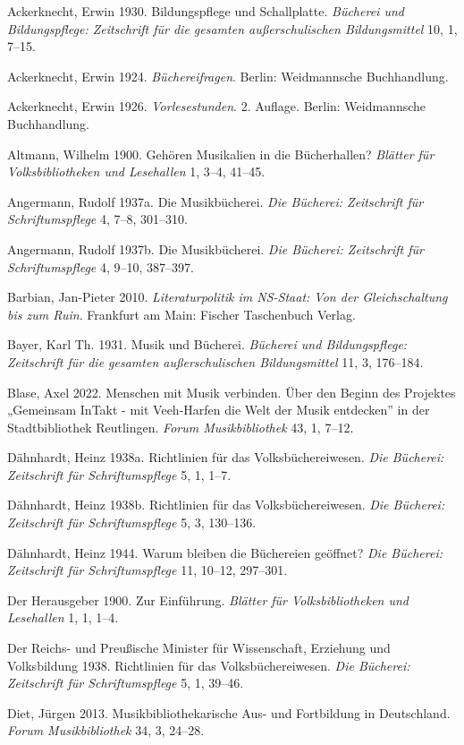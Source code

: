 \documentclass[a4paper,
fontsize=11pt,
oneside,
numbers=noperiodatend,
parskip=half-,
bibliography=totoc,
final
]{scrartcl}
\begin{document}
Ackerknecht, Erwin 1930. Bildungspflege und Schallplatte. \emph{Bücherei
und Bildungspflege: Zeitschrift für die gesamten außerschulischen
Bildungsmittel} 10, 1, 7--15.

Ackerknecht, Erwin 1924. \emph{Büchereifragen}. Berlin: Weidmannsche
Buchhandlung.

Ackerknecht, Erwin 1926. \emph{Vorlesestunden}. 2. Auflage. Berlin:
Weidmannsche Buchhandlung.

Altmann, Wilhelm 1900. Gehören Musikalien in die Bücherhallen?
\emph{Blätter für Volksbibliotheken und Lesehallen} 1, 3--4, 41--45.

Angermann, Rudolf 1937a. Die Musikbücherei. \emph{Die Bücherei:
Zeitschrift für Schriftumspflege} 4, 7--8, 301--310.

Angermann, Rudolf 1937b. Die Musikbücherei. \emph{Die Bücherei:
Zeitschrift für Schriftumspflege} 4, 9--10, 387--397.

Barbian, Jan-Pieter 2010. \emph{Literaturpolitik im NS-Staat: Von der
Gleichschaltung bis zum Ruin}. Frankfurt am Main: Fischer Taschenbuch
Verlag.

Bayer, Karl Th. 1931. Musik und Bücherei. \emph{Bücherei und
Bildungspflege: Zeitschrift für die gesamten außerschulischen
Bildungsmittel} 11, 3, 176--184.

Blase, Axel 2022. Menschen mit Musik verbinden. Über den Beginn des
Projektes „Gemeinsam InTakt - mit Veeh-Harfen die Welt der Musik
entdecken'' in der Stadtbibliothek Reutlingen. \emph{Forum
Musikbibliothek} 43, 1, 7--12.

Dähnhardt, Heinz 1938a. Richtlinien für das Volksbüchereiwesen.
\emph{Die Bücherei: Zeitschrift für Schriftumspflege} 5, 1, 1--7.

Dähnhardt, Heinz 1938b. Richtlinien für das Volksbüchereiwesen.
\emph{Die Bücherei: Zeitschrift für Schriftumspflege} 5, 3, 130--136.

Dähnhardt, Heinz 1944. Warum bleiben die Büchereien geöffnet? \emph{Die
Bücherei: Zeitschrift für Schriftumspflege} 11, 10--12, 297--301.

Der Herausgeber 1900. Zur Einführung. \emph{Blätter für
Volksbibliotheken und Lesehallen} 1, 1, 1--4.

Der Reichs- und Preußische Minister für Wissenschaft, Erziehung und
Volksbildung 1938. Richtlinien für das Volksbüchereiwesen. \emph{Die
Bücherei: Zeitschrift für Schriftumspflege} 5, 1, 39--46.

Diet, Jürgen 2013. Musikbibliothekarische Aus- und Fortbildung in
Deutschland. \emph{Forum Musikbibliothek} 34, 3, 24--28.
\end{document}
